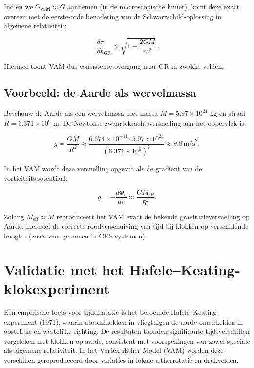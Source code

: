 Indien we $G_\text{swirl} \approx G$ aannemen (in de macroscopische limiet), komt deze exact overeen met de eerste-orde benadering van de Schwarzschild-oplossing in algemene relativiteit:

\begin{equation}
\frac{d\tau}{dt}_\text{GR} \approx \sqrt{1 - \frac{2GM}{rc^2}}.
\end{equation}

Hiermee toont VAM dus consistente overgang naar GR in zwakke velden.

\subsection{Voorbeeld: de Aarde als wervelmassa}

Beschouw de Aarde als een wervelmassa met massa $M = 5.97 \times 10^{24}$ kg en straal $R = 6.371 \times 10^6$ m. De Newtonse zwaartekrachtsversnelling aan het oppervlak is:

\begin{equation}
g = \frac{G M}{R^2} \approx \frac{6.674 \times 10^{-11} \cdot 5.97 \times 10^{24}}{(6.371 \times 10^6)^2} \approx 9.8 \, \text{m/s}^2.
\end{equation}

In het VAM wordt deze versnelling opgevat als de gradiënt van de vorticiteitspotentiaal:

\begin{equation}
g = -\frac{d\Phi_v}{dr} \approx \frac{G M_\text{eff}}{R^2}.
\end{equation}

Zolang $M_\text{eff} \approx M$ reproduceert het VAM exact de bekende gravitatieversnelling op Aarde, inclusief de correcte roodverschuiving van tijd bij klokken op verschillende hoogtes (zoals waargenomen in GPS-systemen).

\section{Validatie met het Hafele–Keating-klokexperiment}

Een empirische toets voor tijddilatatie is het beroemde Hafele–Keating-experiment (1971), waarin atoomklokken in vliegtuigen de aarde omcirkelden in oostelijke en westelijke richting. De resultaten toonden significante tijdsverschillen vergeleken met klokken op aarde, consistent met voorspellingen van zowel speciale als algemene relativiteit. In het Vortex Æther Model (VAM) worden deze verschillen gereproduceerd door variaties in lokale ætherrotatie en drukvelden.

